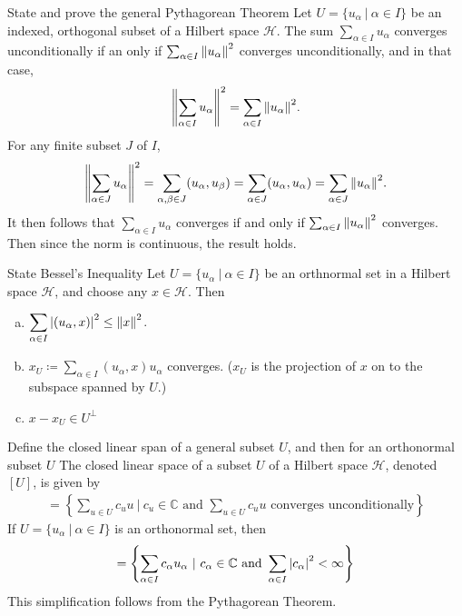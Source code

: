 \documentclass[avery5388,grid,frame]{flashcards}
\def\Cx{\mathbb{C}}
\def\hilb{\mathcal{H}}
\begin{document}
\begin{flashcard}
    {State and prove the general Pythagorean Theorem}
    Let $U = \{u_\alpha\ |\ \alpha \in I\}$ be an indexed, orthogonal subset of a Hilbert space $\hilb$.  The sum $\sum_{\alpha \in I}u_\alpha$ converges unconditionally if an only if $\sum_{\alpha \in I}\norm{u_\alpha}^2$ converges unconditionally, and in that case,
    \begin{align*}
        \norm{\sum_{\alpha \in I} u_\alpha}^2 = \sum_{\alpha \in I} \norm{u_\alpha}^2.
    \end{align*}
    For any finite subset $J$ of $I$,
    \begin{align*}
        \norm{\sum_{\alpha \in J} u_\alpha}^2 = \sum_{\alpha,\beta \in J}(u_\alpha, u_\beta) = \sum_{\alpha \in J} (u_\alpha, u_\alpha) = \sum_{\alpha \in J} \norm{u_\alpha}^2.
    \end{align*}
    It then follows that $\sum_{\alpha \in I} u_\alpha$ converges if and only if $\sum_{\alpha \in I}\norm{u_\alpha}^2$ converges.  Then since the norm is continuous, the result holds.
\end{flashcard}

\begin{flashcard}
    {State Bessel's Inequality}
    Let $U = \{u_\alpha\ |\ \alpha \in I\}$ be an orthnormal set in a Hilbert space $\hilb$, and choose any $x \in \hilb$.  Then
    \begin{enumerate}[(a)]
        \item $\displaystyle\sum_{\alpha \in I} \abs{(u_\alpha, x)}^2 \leq \norm{x}^2$.
        \item $x_U \coloneqq \sum_{\alpha \in I} (u_\alpha, x)u_\alpha$ converges. ($x_U$ is the projection of $x$ on to the subspace spanned by $U$.)
        \item $x - x_U \in U^\perp$
    \end{enumerate}
\end{flashcard}

\begin{flashcard}
    {Define the closed linear span of a general subset $U$, and then for an orthonormal subset $U$}
    The closed linear space of a subset $U$ of a Hilbert space $\hilb$, denoted $[U]$, is given by
    \begin{align*}
        [U] =   \left\{\sum_{u \in U}c_uu\ |\ c_u \in \Cx \text{ and } \sum_{u \in U}c_uu \text{ converges unconditionally}\right\}
    \end{align*}
    If $U = \{u_\alpha\ |\ \alpha \in I\}$ is an orthonormal set, then
    \begin{align*}
        [U] = \left\{\sum_{\alpha \in I} c_\alpha u_\alpha\ |\ c_\alpha \in \Cx \text{ and } \sum_{\alpha \in I} \abs{c_\alpha}^2 < \infty\right\}
    \end{align*}
    This simplification follows from the Pythagorean Theorem.
\end{flashcard}
\end{document}
